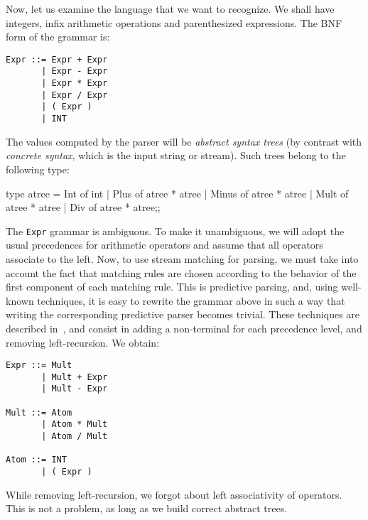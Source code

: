 Now, let us examine the language that we want to recognize. We shall
have integers, infix arithmetic operations and parenthesized
expressions.
The BNF form of the grammar is:
\begin{verbatim}
Expr ::= Expr + Expr
       | Expr - Expr
       | Expr * Expr
       | Expr / Expr
       | ( Expr )
       | INT
\end{verbatim}
The values computed by the parser will be {\em abstract syntax trees}
(by contrast with {\em concrete syntax}, which is the input string or
stream). Such trees belong to the following type:
\begin{caml_example}
type atree =
  Int of int
| Plus of atree * atree
| Minus of atree * atree
| Mult of atree * atree
| Div of atree * atree;;
\end{caml_example}
The {\tt Expr} grammar is ambiguous. To make it unambiguous, we will
adopt the usual precedences for arithmetic operators and assume that
all operators associate to the left. Now, to use stream matching for
parsing, we must take into account the fact that matching rules are
chosen according to the behavior of the first component of each
matching rule. This is predictive parsing, and, using well-known
techniques, it is easy to rewrite the grammar above in such a way that
writing the corresponding predictive parser becomes trivial. These
techniques are described in~\cite{DragonBook}, and consist in adding
a non-terminal for each precedence level, and removing left-recursion.
We obtain:
\begin{verbatim}
Expr ::= Mult
       | Mult + Expr
       | Mult - Expr

Mult ::= Atom
       | Atom * Mult
       | Atom / Mult

Atom ::= INT
       | ( Expr )
\end{verbatim}
While removing left-recursion, we forgot about left associativity of
operators. This is not a problem, as long as we build correct abstract
trees.

